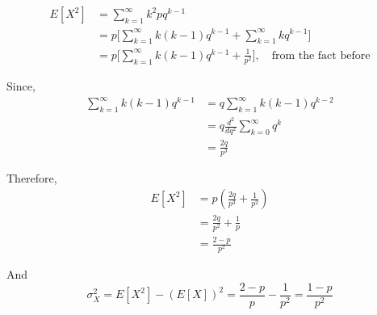 \documentclass[UTF8]{article}
\begin{document}
\begin{enumerate}
        \begin{equation*}
            \begin{split}
                E[X^2] &= \sum^\infty_{k=1}k^2pq^{k-1}\\
                &=p\bigg[\sum^\infty_{k=1}k(k-1)q^{k-1}+\sum^\infty_{k=1}kq^{k-1}\bigg]\\
                &=p\bigg[\sum^\infty_{k=1}k(k-1)q^{k-1}+\frac{1}{p^2}\bigg],\quad\text{from the fact before}
            \end{split}
        \end{equation*}

        Since,
        \begin{equation*}
            \begin{split}
                \sum^\infty_{k=1}k(k-1)q^{k-1} & =q\sum^\infty_{k=1}k(k-1)q^{k-2}\\
                &= q\frac{d^2}{dq^2}\sum^\infty_{k=0}q^k\\
                &=\frac{2q}{p^3}
            \end{split}
        \end{equation*}
        
        Therefore,
        \begin{equation*}
            \begin{split}
                E[X^2] &= p(\frac{2q}{p^3}+\frac{1}{p^2})\\
                &=\frac{2q}{p^2}+\frac{1}{p}\\
                &=\frac{2-p}{p^2}
            \end{split}
        \end{equation*}
        
        And
        \begin{equation*}
            \sigma^2_X=E[X^2]-(E[X])^2=\frac{2-p}{p}-\frac{1}{p^2}=\frac{1-p}{p^2}
        \end{equation*}


\end{enumerate}
\end{document}
